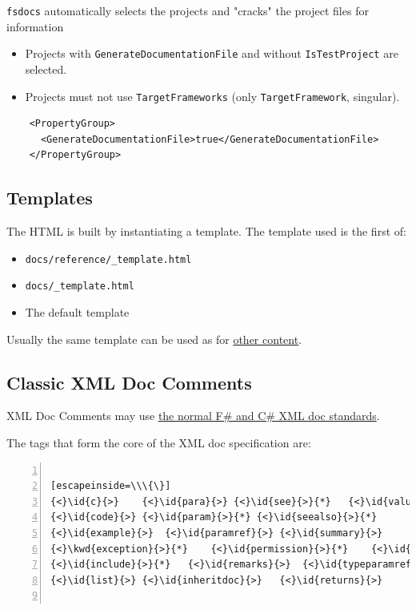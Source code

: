 \documentclass{article}
\newcommand{\id}[1]{\textcolor{black}{#1}}
\newcommand{\kwd}[1]{\textcolor{navy}{#1}}
\begin{document}
\texttt{fsdocs} automatically selects the projects and "cracks" the project files for information
\begin{itemize}
\item Projects with \texttt{GenerateDocumentationFile} and without \texttt{IsTestProject} are selected.

\item Projects must not use \texttt{TargetFrameworks} (only \texttt{TargetFramework}, singular).

\end{itemize}

\begin{lstlisting}
    <PropertyGroup>
      <GenerateDocumentationFile>true</GenerateDocumentationFile>
    </PropertyGroup>

\end{lstlisting}
\subsection*{Templates}



The HTML is built by instantiating a template. The template used is the first of:
\begin{itemize}
\item 

\texttt{docs/reference/\_template.html}

\item 

\texttt{docs/\_template.html}

\item 

The default template

\end{itemize}



Usually the same template can be used as for \href{content.html}{other content}.
\subsection*{Classic XML Doc Comments}



XML Doc Comments may use \href{https://learn.microsoft.com/en-us/dotnet/csharp/programming-guide/xmldoc/}{the normal F\# and C\# XML doc standards}.


The tags that form the core of the XML doc specification are:
\begin{lstlisting}[numbers=left]

[escapeinside=\\\{\}]
{<}\id{c}{>}	{<}\id{para}{>}	{<}\id{see}{>}{*}	{<}\id{value}{>}
{<}\id{code}{>}	{<}\id{param}{>}{*}	{<}\id{seealso}{>}{*}
{<}\id{example}{>}	{<}\id{paramref}{>}	{<}\id{summary}{>}
{<}\kwd{exception}{>}{*}	{<}\id{permission}{>}{*}	{<}\id{typeparam}{>}{*}
{<}\id{include}{>}{*}	{<}\id{remarks}{>}	{<}\id{typeparamref}{>}
{<}\id{list}{>}	{<}\id{inheritdoc}{>}	{<}\id{returns}{>}


\end{lstlisting}
\end{document}
